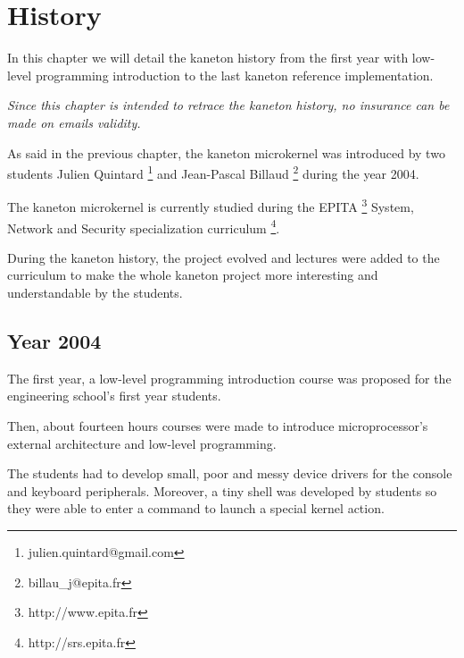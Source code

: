 
%
%

\chapter{History}

In this chapter we will detail the kaneton history from the first
year with low-level programming introduction to the last kaneton
reference implementation.

\newpage

%
%

\textit{Since this chapter is intended to retrace the kaneton history,
  no insurance can be made on emails validity.}

As said in the previous chapter, the kaneton microkernel was introduced
by two students
Julien Quintard
  \footnote{julien.quintard@gmail.com} and
Jean-Pascal Billaud
  \footnote{billau\_j@epita.fr}
during the year 2004.

The kaneton microkernel is currently studied during the
EPITA
  \footnote{http://www.epita.fr}
System, Network and Security specialization curriculum
  \footnote{http://srs.epita.fr}.

During the kaneton history, the project evolved and lectures were added
to the curriculum to make the whole kaneton project more interesting and
understandable by the students.

%
%

\section{Year 2004}

The first year, a low-level programming introduction course was proposed
for the engineering school's first year students.

Then, about fourteen hours courses were made to introduce microprocessor's
external architecture and low-level programming.

The students had to develop small, poor and messy device drivers for the
console and keyboard peripherals. Moreover, a tiny shell was developed
by students so they were able to enter a command to launch a special
kernel action.

